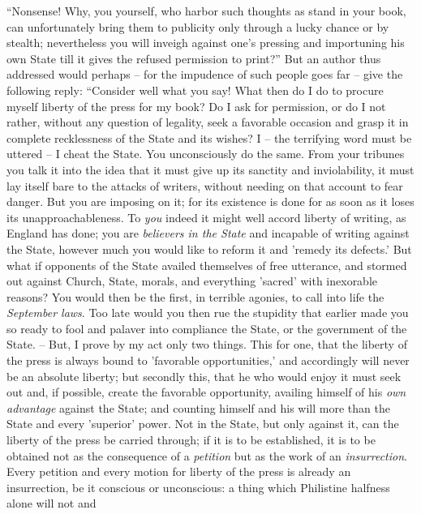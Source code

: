 \documentclass[12pt,a4paper]{book}
\begin{document}
``Nonsense! Why, you yourself, who harbor such thoughts as stand in your 
book, can unfortunately bring them to publicity only through a lucky chance or 
by stealth; nevertheless you will inveigh against one's pressing and 
importuning his own State till it gives the refused permission to print?'' 
But an author thus addressed would perhaps -- for the impudence of such people 
goes far -- give the following reply: ``Consider well what you say! What then 
do I do to procure myself liberty of the press for my book? Do I ask for 
permission, or do I not rather, without any question of legality, seek a 
favorable occasion and grasp it in complete recklessness of the State and its 
wishes? I -- the terrifying word must be uttered -- I cheat the State. You 
unconsciously do the same. From your tribunes you talk it into the idea that 
it must give up its sanctity and inviolability, it must lay itself bare to the 
attacks of writers, without needing on that account to fear danger. But you 
are imposing on it; for its existence is done for as soon as it loses its 
unapproachableness. To \textit{you} indeed it might well accord liberty of 
writing, as England has done; you are \textit{believers in the State} and 
incapable of writing against the State, however much you would like to reform 
it and 'remedy its defects.' But what if opponents of the State availed 
themselves of free utterance, and stormed out against Church, State, morals, 
and everything 'sacred' with inexorable reasons? You would then be the first, 
in terrible agonies, to call into life the \textit{September laws}. Too late 
would you then rue the stupidity that earlier made you so ready to fool and 
palaver into compliance the State, or the government of the State. -- But, I 
prove by my act only two things. This for one, that the liberty of the press 
is always bound to 'favorable opportunities,' and accordingly will never be an 
absolute liberty; but secondly this, that he who would enjoy it must seek out 
and, if possible, create the favorable opportunity, availing himself of his 
\textit{own advantage} against the State; and counting himself and his will 
more than the State and every 'superior' power. Not in the State, but only 
against it, can the liberty of the press be carried through; if it is to be 
established, it is to be obtained not as the consequence of a 
\textit{petition} but as the work of an \textit{insurrection}. Every petition 
and every motion for liberty of the press is already an insurrection, be it 
conscious or unconscious: a thing which Philistine halfness alone will not and 
\end{document}
